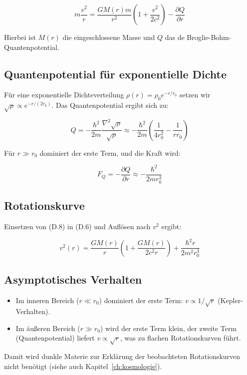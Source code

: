 \[
m\frac{v^2}{r} = \frac{GM(r)m}{r^2}\left(1 + \frac{v^2}{2c^2}\right) - \frac{\partial Q}{\partial r} \tag{D.6}
\]

Hierbei ist \( M(r) \) die eingeschlossene Masse und \( Q \) das de Broglie-Bohm-Quantenpotential.

\subsection{Quantenpotential für exponentielle Dichte}
\label{sub:herleitungen_rot_q}

Für eine exponentielle Dichteverteilung \( \rho(r) = \rho_0 e^{-r/r_0} \) setzen wir \( \sqrt{\rho} \propto e^{-r/(2r_0)} \). Das Quantenpotential ergibt sich zu:

\[
Q = -\frac{\hbar^2}{2m} \frac{\nabla^2 \sqrt{\rho}}{\sqrt{\rho}} \approx -\frac{\hbar^2}{2m} \left( \frac{1}{4r_0^2} - \frac{1}{r r_0} \right) \tag{D.7}
\]

Für \( r \gg r_0 \) dominiert der erste Term, und die Kraft wird:

\[
F_Q = -\frac{\partial Q}{\partial r} \approx -\frac{\hbar^2}{2m r_0^3} \tag{D.8}
\]

\subsection{Rotationskurve}
\label{sub:herleitungen_rot_kurve}

Einsetzen von (D.8) in (D.6) und Auflösen nach \( v^2 \) ergibt:

\[
v^2(r) = \frac{GM(r)}{r} \left(1 + \frac{GM(r)}{2c^2 r}\right) + \frac{\hbar^2 r}{2m^2 r_0^3} \tag{D.9}
\]

\subsection{Asymptotisches Verhalten}
\label{sub:herleitungen_rot_asymptote}

\begin{itemize}
    \item Im inneren Bereich (\( r \ll r_0 \)) dominiert der erste Term: \( v \propto 1/\sqrt{r} \) (Kepler-Verhalten).
    \item Im äußeren Bereich (\( r \gg r_0 \)) wird der erste Term klein, der zweite Term (Quantenpotential) liefert \( v \propto \sqrt{r} \), was zu flachen Rotationskurven führt.
\end{itemize}

Damit wird dunkle Materie zur Erklärung der beobachteten Rotationskurven nicht benötigt (siehe auch Kapitel~\ref{ch:kosmologie}).

